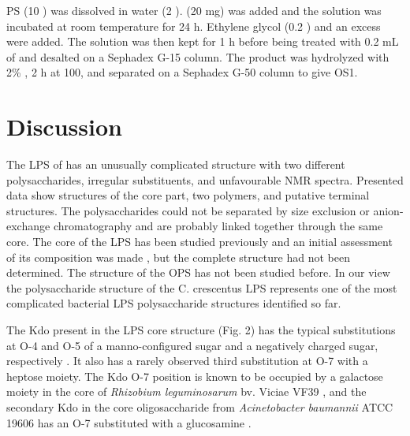 		 \ac{PS} (10 \milligram) was dissolved in water (2 \millilitre).  (20 mg) was added and the solution was incubated at room temperature for 24 h. Ethylene glycol (0.2 \millilitre) and an excess  were added. The solution was then kept for 1 h before being treated with 0.2 mL of  and desalted on a Sephadex G-15 column. The product was hydrolyzed with 2\% , 2 h at 100\cel, and  separated on a Sephadex G-50 column to give \ac{OS}1.


\section{Discussion} %
\label{sec:discussion}

	The \ac{LPS} of \caulobacter has an unusually complicated structure with two different polysaccharides, irregular substituents, and unfavourable \ac{NMR} spectra. Presented data show structures of the core part, two polymers, and putative terminal structures. The polysaccharides could not be separated by size exclusion or anion-exchange chromatography and are probably linked together through the same core. The core of the \caulobacter{} \ac{LPS} has been studied previously and an initial assessment of its composition was made , but the complete structure had not been determined. The structure of the \ac{OPS} has not been studied before. In our view the polysaccharide structure of the C. crescentus \ac{LPS} represents one of the most complicated bacterial \ac{LPS} polysaccharide structures identified so far.

	The Kdo present in the \ac{LPS} core structure (Fig. 2) has the typical substitutions at O-4 and O-5 of a manno-configured sugar and a negatively charged sugar, respectively . It also has a rarely observed third substitution at O-7 with a heptose moiety. The Kdo O-7 position is known to be occupied by a galactose moiety in the core of \textit{Rhizobium leguminosarum} bv. Viciae VF39 , and the secondary Kdo in the core oligosaccharide from \textit{Acinetobacter baumannii} ATCC 19606 has an O-7 substituted with a glucosamine . 

